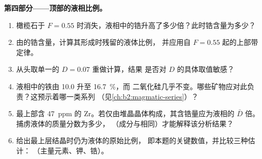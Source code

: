 \begin{problem}
\noindent\textbf{第四部分——顶部的液相比例。}
\begin{enumerate}[resume]
\item 橄榄石于
$F = 0.55$ 时消失，液相中的锆升高了多少倍？此时锆含量为多少？
\item 由的锆含量，计算其形成时残留的液体比例，
并应用自 $F = 0.55$ 起的上部带定律。
\item 从头取单一的 $D = 0.07$ 重做计算，结果
是否对 $D$ 的具体取值敏感？
\item 液相中的铁由 10.0 升至 \qty{16.7}{\percent}，而
二氧化硅几乎不变。哪些矿物应对此负责？这预示着哪一类系列
（见\cref{ch:b2:magmatic-series}）？
\item 最上部含 \qty{47}{ppm} 的 Zr。若仅由堆晶晶体构成，其含锆量应为液相的
$\bar D$ 倍。捕虏液体的质量分数为多少，
（成分与相同）才能解释该分析结果？
\item 给出最上层结晶时仍为液体的原始比例，
即本题的关键数值，并比较三种估计：
（主量元素、钾、锆）。
\end{enumerate}
\end{problem}
